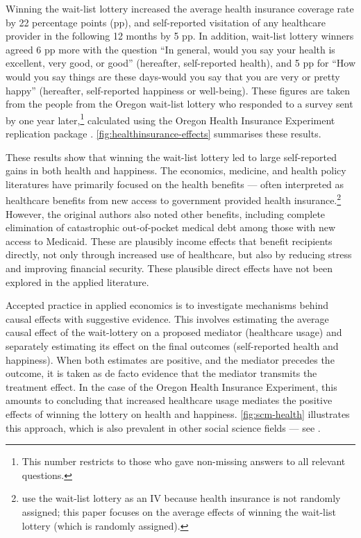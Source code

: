Winning the wait-list lottery increased the average health insurance coverage rate by 22 percentage points (pp), and self-reported visitation of any healthcare provider in the following 12 months by 5 pp.
In addition, wait-list lottery winners agreed 6 pp more with the question ``In general, would you say your health is excellent, very good, or good'' (hereafter, self-reported health),
and 5 pp for ``How would you say things are these days-would you say that you are very  or pretty happy'' (hereafter, self-reported happiness or well-being).
These figures are taken from the  people from the Oregon wait-list lottery who responded to a survey sent by \cite{finkelstein2008oregon} one year later,\footnote{
    This number restricts to those who gave non-missing answers to all relevant questions.
}
calculated using the Oregon Health Insurance Experiment replication package \citep{icspr2014oregon}.
\autoref{fig:healthinsurance-effects} summarises these results.

These results show that winning the wait-list lottery led to large self-reported gains in both health and happiness.
The economics, medicine, and health policy literatures have primarily focused on the health benefits --- often interpreted as healthcare benefits from new access to government provided health insurance.\footnote{
    \cite{finkelstein2008oregon} use the wait-list lottery as an IV because health insurance is not randomly assigned; this paper focuses on the average effects of winning the wait-list lottery (which is randomly assigned).
}
However, the original authors also noted other benefits, including complete elimination of catastrophic out-of-pocket medical debt among those with new access to Medicaid.
These are plausibly income effects that benefit recipients directly, not only through increased use of healthcare, but also by reducing stress and improving financial security.
These plausible direct effects have not been explored in the applied literature.

Accepted practice in applied economics is to investigate mechanisms behind causal effects with suggestive evidence.
This involves estimating the average causal effect of the wait-lottery on a proposed mediator (healthcare usage) and separately estimating its effect on the final outcomes (self-reported health and happiness).
When both estimates are positive, and the mediator precedes the outcome, it is taken as de facto evidence that the mediator transmits the treatment effect.
In the case of the Oregon Health Insurance Experiment, this amounts to concluding that increased healthcare usage mediates the positive effects of winning the lottery on health and happiness.
\autoref{fig:scm-health} illustrates this approach, which is also prevalent in other social science fields --- see \cite{blackwell2024assumption,green2010enough}.

